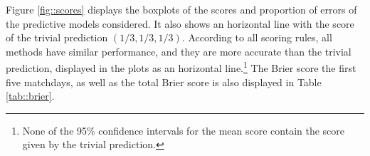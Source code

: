 \documentclass[journal,article,accept,moreauthors,pdftex,12pt,a4paper]{mdpi}
\begin{document}




%


Figure \ref{fig::scores} displays the boxplots of the scores and proportion of errors of the predictive models considered.
It also shows an horizontal line with the score of the trivial prediction $(1/3,1/3,1/3)$. 
According to all scoring rules, all methods have similar performance, and they are more accurate than the trivial prediction, displayed in the plots
as an horizontal line.\footnote{None of the 95\% confidence intervals for the mean score contain the score given by the trivial prediction.} The Brier score the first five matchdays, as well as the total Brier score is also displayed 
in Table \ref{tab::brier}.
\end{document}
